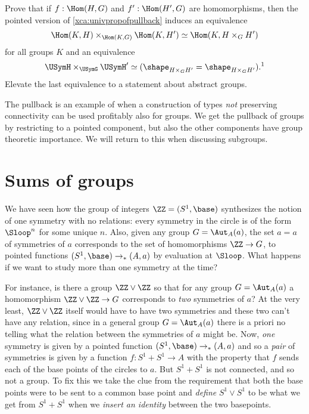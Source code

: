 \begin{xca}
  Prove that if $f:\Hom(H,G)$ and $f':\Hom(H',G)$ are homomorphisms,
  then the pointed version of \cref{xca:univpropofpullback} induces an equivalence
  $$
  \Hom(K,H)\times_{\Hom(K,G)}\Hom(K,H')\simeq \Hom(K,H\times_GH')
  $$
  for all groups $K$ and an equivalence
  \[
    \USymH \times_{\USymG} \USymH'
    \simeq (\shape_{H\times_GH'}=\shape_{H\times_GH'}).\text{\footnotemark}
  \]
  Elevate the last equivalence to a statement about abstract groups.
\end{xca}

\begin{remark}
  The pullback is an example of when a construction of types \emph{not} preserving connectivity can be used profitably also for groups.
  We get the pullback of groups by restricting to a pointed component, but also the other components have group theoretic importance.
  We will return to this when discussing subgroups.
\end{remark}



\section{Sums of groups}
\label{sec:coprod}
We have seen how the group of integers $\ZZ=(S^1,\base)$ synthesizes the notion of one symmetry with no relations: every symmetry in the circle is of the form $\Sloop^n$ for some unique $n$.  Also, given any group $G=\Aut_A(a)$, the set $a=a$ of symmetries of $a$ corresponds to the set of homomorphisms $\ZZ\to G$, \ie to pointed functions $(S^1,\base)\to_*(A,a)$ by evaluation at $\Sloop$.  What happens if we want to study more than one symmetry at the time?

For instance, is there a group $\ZZ\vee\ZZ$ so that for any group $G=\Aut_A(a)$ a homomorphism $\ZZ\vee\ZZ\to G$ corresponds to \emph{two} symmetries of $a$?
At the very least, $\ZZ\vee\ZZ$ itself would have to have two symmetries and these two can't have any relation, since in a general group $G=\Aut_A(a)$ there is a priori no telling what the relation between the symmetries of $a$ might be.
Now, \emph{one} symmetry is given by a pointed function $(S^1,\base)\to_*(A,a)$ and so a \emph{pair} of symmetries is given by a function $f:S^1+S^1\to A$ with the property that $f$ sends each of the base points of the circles to $a$.  But $S^1+S^1$ is not connected, and so not a group.  To fix this we take the clue from the requirement that both the base points were to be sent to a common base point and \emph{define} $S^1\vee S^1$ to be what we get from $S^1+S^1$ when we \emph{insert an identity} between the two basepoints.

